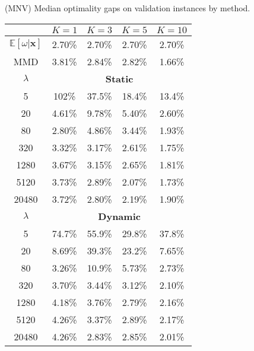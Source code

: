 \begin{table}[h]
    \begin{minipage}{0.49\linewidth}
        \TABLE
        {(MNV) Median optimality gaps on validation instances by method. \label{tab:mnv_gaps}}
        {
        \begin{tabular}{ccccc}
        \toprule
         & $K=1$ & $K=3$ & $K=5$ & $K=10$ \\
        \midrule
        $\mathbb{E}[\omega | \mathbf{x}]$ & 2.70\%    & 2.70\%    & 2.70\%    & 2.70\%    \\
        MMD & 3.81\%    & 2.84\%    & 2.82\%    & 1.66\%    \\
        \midrule
        \multicolumn{1}{c}{$\lambda$} & \multicolumn{4}{c}{\textbf{Static}} \\
        \midrule
        5     & 102\%     & 37.5\%    & 18.4\%    & 13.4\%    \\
        20    & 4.61\%    & 9.78\%    & 5.40\%    & 2.60\%    \\
        80    & 2.80\%    & 4.86\%    & 3.44\%    & 1.93\%    \\
        320   & 3.32\%    & 3.17\%    & 2.61\%    & 1.75\%    \\
        1280  & 3.67\%    & 3.15\%    & 2.65\%    & 1.81\%    \\
        5120  & 3.73\%    & 2.89\%    & 2.07\%    & 1.73\%    \\
        20480 & 3.72\%    & 2.80\%    & 2.19\%    & 1.90\%    \\
        \midrule
        \multicolumn{1}{c}{$\lambda$} & \multicolumn{4}{c}{\textbf{Dynamic}} \\
        \midrule
        5     & 74.7\%    & 55.9\%    & 29.8\%    & 37.8\%    \\
        20    & 8.69\%    & 39.3\%    & 23.2\%    & 7.65\%    \\
        80    & 3.26\%    & 10.9\%    & 5.73\%    & 2.73\%    \\
        320   & 3.70\%    & 3.44\%    & 3.12\%    & 2.10\%    \\
        1280  & 4.18\%    & 3.76\%    & 2.79\%    & 2.16\%    \\
        5120  & 4.26\%    & 3.37\%    & 2.89\%    & 2.17\%    \\
        20480 & 4.26\%    & 2.83\%    & 2.85\%    & 2.01\%    \\
        \bottomrule
        \end{tabular}}{}
    \end{minipage}

\end{table}
